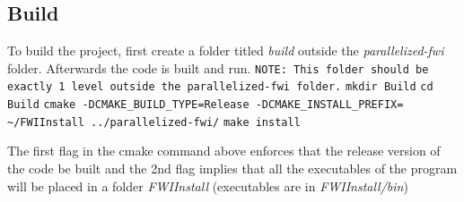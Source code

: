 \documentclass[10pt]{article}
\begin{document}
\subsection{Build}
To build the project, first create a folder titled \textit{build} outside the \textit{parallelized-fwi} folder. Afterwards the code is built and run. 
\newline
\texttt{NOTE: This folder should be exactly 1 level outside the parallelized-fwi folder.}
\newline
\texttt{mkdir Build}
\newline
\texttt{cd Build}
\newline
\texttt{cmake -DCMAKE\_BUILD\_TYPE=Release -DCMAKE\_INSTALL\_PREFIX= \textasciitilde/FWIInstall ../parallelized-fwi/}
\newline
\texttt{make install} 
\newline

\noindent The first flag in the cmake command above enforces that the release version of the code be built and the 2nd flag implies that all the executables of the program will be placed in a folder \textit{FWIInstall} (executables are in \textit{FWIInstall/bin})
\end{document}

